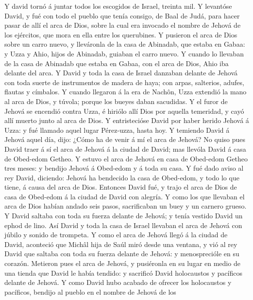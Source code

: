  Y david tornó á juntar todos los escogidos de Israel,
treinta mil.  Y levantóse David, y fué con todo el pueblo
que tenía consigo, de Baal de Judá, para hacer pasar de allí el arca de
Dios, sobre la cual era invocado el nombre de Jehová de los ejércitos,
que mora en ella entre los querubines.  Y pusieron el arca
de Dios sobre un carro nuevo, y lleváronla de la casa de Abinadab, que
estaba en Gabaa: y Uzza y Ahio, hijos de Abinadab, guiaban el carro
nuevo.  Y cuando lo llevaban de la casa de Abinadab que
estaba en Gabaa, con el arca de Dios, Ahio iba delante del arca.
 Y David y toda la casa de Israel danzaban delante de Jehová
con toda suerte de instrumentos de madera de haya; con arpas, salterios,
adufes, flautas y címbalos.  Y cuando llegaron á la era de
Nachôn, Uzza extendió la mano al arca de Dios, y túvola; porque los
bueyes daban sacudidas.  Y el furor de Jehová se encendió
contra Uzza, é hiriólo allí Dios por aquella temeridad, y cayó allí
muerto junto al arca de Dios.  Y entristecióse David por
haber herido Jehová á Uzza: y fué llamado aquel lugar Pérez-uzza, hasta
hoy.  Y temiendo David á Jehová aquel día, dijo: ¿Cómo ha de
venir á mí el arca de Jehová?  No quiso pues David traer á
sí el arca de Jehová á la ciudad de David; mas llevóla David á casa de
Obed-edom Getheo.  Y estuvo el arca de Jehová en casa de
Obed-edom Getheo tres meses: y bendijo Jehová á Obed-edom y á toda su
casa.  Y fué dado aviso al rey David, diciendo: Jehová ha
bendecido la casa de Obed-edom, y todo lo que tiene, á causa del arca de
Dios. Entonces David fué, y trajo el arca de Dios de casa de Obed-edom á
la ciudad de David con alegría.  Y como los que llevaban el
arca de Dios habían andado seis pasos, sacrificaban un buey y un carnero
grueso.  Y David saltaba con toda su fuerza delante de
Jehová; y tenía vestido David un ephod de lino.  Así David
y toda la casa de Israel llevaban el arca de Jehová con júbilo y sonido
de trompeta.  Y como el arca de Jehová llegó á la ciudad de
David, aconteció que Michâl hija de Saúl miró desde una ventana, y vió
al rey David que saltaba con toda su fuerza delante de Jehová: y
menosprecióle en su corazón.  Metieron pues el arca de
Jehová, y pusiéronla en su lugar en medio de una tienda que David le
había tendido: y sacrificó David holocaustos y pacíficos delante de
Jehová.  Y como David hubo acabado de ofrecer los
holocaustos y pacíficos, bendijo al pueblo en el nombre de Jehová de los
